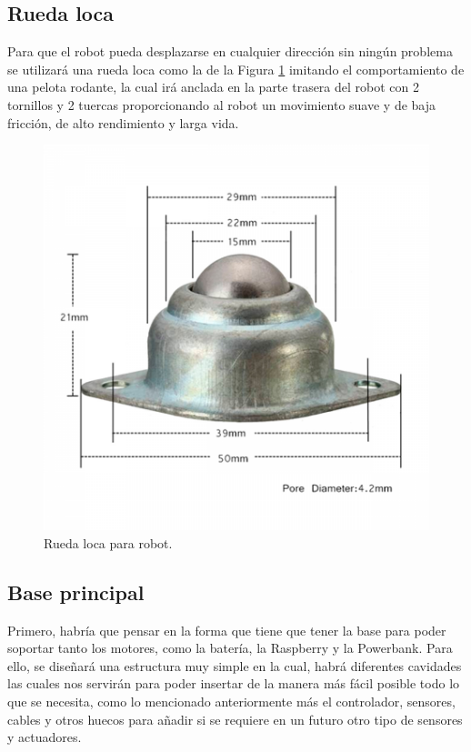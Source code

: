 \subsection{Rueda loca}
\label{subsec:rueda_loca}

Para que el robot pueda desplazarse en cualquier dirección sin ningún problema se utilizará una rueda loca como la de la Figura \ref{fig:Rueda_loca} imitando el comportamiento de una pelota rodante, la cual irá anclada en la parte trasera del robot con 2 tornillos y 2 tuercas proporcionando al robot un movimiento suave y de baja fricción, de alto rendimiento y larga vida.


\begin{figure}[H]
  \centering
  \includegraphics[scale=0.4]{figs/rueda_loca} %
  \caption{Rueda loca para robot.}
  \label{fig:Rueda_loca}
\end{figure}



\subsection{Base principal}
\label{subsec:base_principal}

Primero, habría que pensar en la forma que tiene que tener la base para poder soportar tanto los motores, como la batería, la Raspberry y la Powerbank. Para ello, se diseñará una estructura muy simple en la cual, habrá diferentes cavidades las cuales nos servirán para poder insertar de la manera más fácil posible todo lo que se necesita, como lo mencionado anteriormente más el controlador, sensores, cables y otros huecos para añadir si se requiere en un futuro otro tipo de sensores y actuadores. \\

